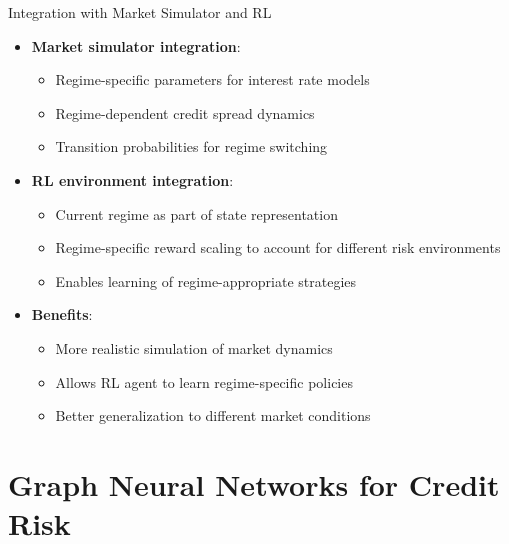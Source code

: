 \documentclass{beamer}
\begin{document}
\begin{frame}{Integration with Market Simulator and RL}
\begin{itemize}
    \item \textbf{Market simulator integration}:
    \begin{itemize}
        \item Regime-specific parameters for interest rate models
        \item Regime-dependent credit spread dynamics
        \item Transition probabilities for regime switching
    \end{itemize}
    \item \textbf{RL environment integration}:
    \begin{itemize}
        \item Current regime as part of state representation
        \item Regime-specific reward scaling to account for different risk environments
        \item Enables learning of regime-appropriate strategies
    \end{itemize}
    \item \textbf{Benefits}:
    \begin{itemize}
        \item More realistic simulation of market dynamics
        \item Allows RL agent to learn regime-specific policies
        \item Better generalization to different market conditions
    \end{itemize}
\end{itemize}
\end{frame}

\section{Graph Neural Networks for Credit Risk}
\end{document}
